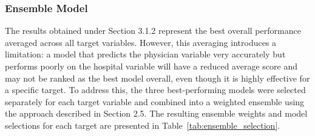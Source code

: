 \documentclass[final, 9pt, twocolumn]{saucis}
\begin{document}
\subsubsection{Ensemble Model}

The results obtained under Section 3.1.2 represent the best overall performance averaged across all target variables. However, this averaging introduces a limitation: a model that predicts the physician variable very accurately but performs poorly on the hospital variable will have a reduced average score and may not be ranked as the best model overall, even though it is highly effective for a specific target. To address this, the three best-performing models were selected separately for each target variable and combined into a weighted ensemble using the approach described in Section 2.5. The resulting ensemble weights and model selections for each target are presented in Table~\ref{tab:ensemble_selection}.
\end{document}

